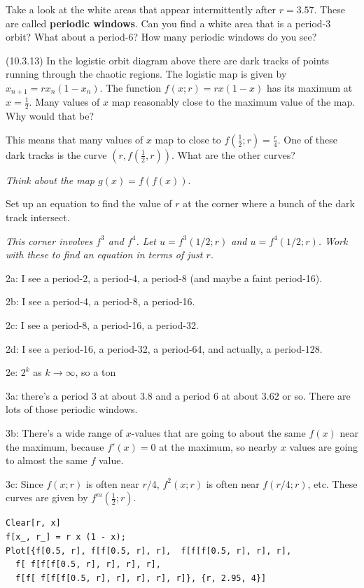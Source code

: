 \documentclass[12pt,letterpaper,noanswers]{exam}
\begin{document}
\begin{questions}
\begin{parts}
\item Take a look at the white areas that appear intermittently after $r=3.57$.  These are called \textbf{periodic windows}.  Can you find a white area that is a period-3 orbit?  What about a period-6?  How many periodic windows do you see?
\item(10.3.13) In the logistic orbit diagram above there are dark tracks of points running through the chaotic regions.  The logistic map is given by $x_{n+1} = rx_n(1-x_n)$.  The function $f(x; r) = rx(1-x)$ has its maximum at $x=\frac{1}{2}$.  Many values of $x$ map reasonably close to the maximum value of the map.  Why would that be?

\item This means that many values of $x$ map to close to $f(\frac{1}{2}; r) = \frac{r}{4}$.   One of these dark tracks is the curve $(r, f(\frac{1}{2},r))$.  What are the other curves?

\emph{Think about the map $g(x) = f(f(x))$}.
\item Set up an equation to find the value of $r$ at the corner where a bunch of the dark track intersect.

\emph{This corner involves $f^3$ and $f^4$.  Let $u = f^3(1/2; r)$ and $u = f^4(1/2; r)$.  Work with these to find an equation in terms of just $r$.}

\end{parts}

\end{questions}
\eject 


2a: I see a period-2, a period-4, a period-8 (and maybe a faint period-16).

2b: I see a period-4, a period-8, a period-16.

2c: I see a period-8, a period-16, a period-32.

2d: I see a period-16, a period-32, a period-64, and actually, a period-128.



2e: $2^k$ as $k\rightarrow\infty$, so a ton

3a: there's a period 3 at about 3.8 and a period 6 at about 3.62 or so.  There are lots of those periodic windows.

3b: There's a wide range of $x$-values that are going to about the same $f(x)$ near the maximum, because $f'(x) = 0$ at the maximum, so nearby $x$ values are going to almost the same $f$ value.

3c: Since $f(x;r)$ is often near $r/4$, $f^2(x;r)$ is often near $f(r/4;r)$, etc.  These curves are given by $f^m(\frac{1}{2}; r)$.
\begin{verbatim}
Clear[r, x]
f[x_, r_] = r x (1 - x);
Plot[{f[0.5, r], f[f[0.5, r], r],  f[f[f[0.5, r], r], r], 
  f[ f[f[f[0.5, r], r], r], r], 
  f[f[ f[f[f[0.5, r], r], r], r], r]}, {r, 2.95, 4}]
\end{verbatim}
\end{document}
